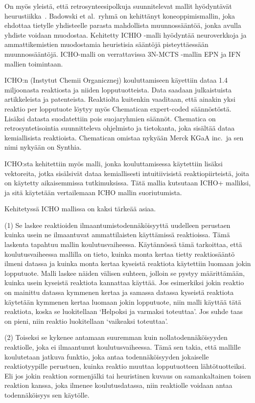 \documentclass[finnish,twoside,censored,tkt,sw-line]{HYthesisML}
\begin{document}
On myös yleistä, että retrosynteesipolkuja suunnitelevat mallit hyödyntävät heurustiikka~\cite{ExpertKnowledgeRetorsynthesis}.
Badowski et al.\ ryhmä on kehittänyt koneoppimismallin, joka ehdottaa tietylle yhdisteelle parasta mahdollista muunnossääntöä, jonka avulla yhdiste voidaan muodostaa.
Kehitetty ICHIO -malli hyödyntää  neuroverkkoja ja ammattikemistien muodostamia heuristisia sääntöjä pisteyttäessään muunnossääntöjä.
ICHO-malli on verrattavissa 3N-MCTS -mallin EPN ja IFN mallien toimintaan.

ICHO:n (Instytut Chemii Organicznej) kouluttamiseen käyettiin dataa 1.4 miljoonasta reaktiosta ja niiden lopputuotteista.
Data saadaan julkaistuista artikkeleista ja patenteista.
Reaktiolta kuitenkin vaaditaan, että ainakin yksi reaktio per lopputuote löytyy myös Chematican expert-coded säännöstöstä.
Lisäksi datasta suodatettiin pois suojaryhmien säännöt.
Chematica on retrosyntetisointia suunnitteleva ohjelmisto ja tietokanta, joka sisältää dataa kemiallisista reaktioista.
Chematican omistaa nykyään Merck KGaA inc.\ ja sen nimi nykyään on Synthia.

ICHO:sta kehitettiin myös malli, jonka kouluttamisessa käytettiin lisäksi vektoreita, jotka sisälsivät dataa kemiallisesti intuitiivisistä reaktiopiirteistä, joita on käytetty aikaisemmissa tutkimuksissa.
Tätä mallia kutsutaan ICHO+ malliksi, ja sitä käytetään vertailemaan ICHO mallin suoriutumista.

Kehitetyssä ICHO mallissa on kaksi tärkeää asiaa.

(1) Se laskee reaktioiden ilmaantumistodennäköisyyttä uudelleen perustaen kuinka usein ne ilmaantuvat ammattilaisten käyttämissä reaktioissa.
Tämä laskenta tapahtuu mallin koulutusvaiheessa.
Käytännössä tämä tarkoittaa, että koulutusvaiheessa mallilla on tieto, kuinka monta kertaa tietty reaktiosääntö ilmeni datassa ja kuinka monta kertaa kyseistä reaktiota käytettiin luomaan jokin lopputuote.
Malli laskee näiden välisen suhteen, jolloin se pystyy määrittämään, kuinka usein kyseistä reaktiota kannattaa käyttää.
Jos esimerkiksi jokin reaktio on mainittu datassa kymmenen kertaa ja samassa datassa kyseistä reaktiota käytetään kymmenen kertaa luomaan jokin lopputuote, niin malli käyttää tätä reaktiota, koska se luokitellaan `Helpoksi ja varmaksi toteuttaa'.
Jos suhde taas on pieni, niin reaktio luokitellaan `vaikeaksi toteuttaa'.

(2) Toiseksi se kykenee antamaan suuremman kuin nollatodennäköisyyden reaktiolle, joka ei ilmaantunut koulutusvaiheessa.
Tämä sen takia, että mallille koulutetaan jatkuva funktio, joka antaa todennäköisyyden jokaiselle reaktiotyypille perustuen, kuinka reaktio muuttaa lopputuotteen lähtötuotteiksi.
Eli jos jokin reaktion sormenjälki tai heuristinen kuvaus on samankaltainen toisen reaktion kanssa, joka ilmenee koulutusdatassa, niin reaktiolle voidaan antaa todennäköisyys sen käytölle.
\end{document}
